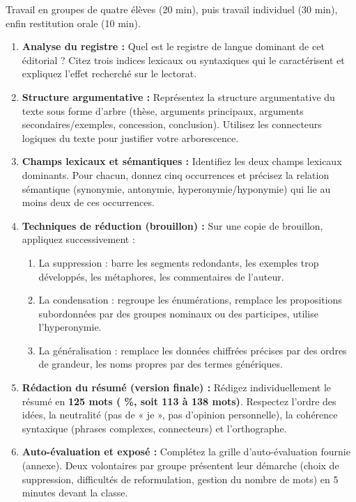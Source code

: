 \documentclass[11pt]{article}
\newcommand{\cle}[1]{{\popxbold\color{popdark}#1}}
\newcounter{popsec}
\newcounter{popsub}
\newcommand{\courssub}[1]{%
  \stepcounter{popsub}%
  \par\vspace{9pt}\noindent{\popxbold\fontsize{11.5}{13}\selectfont\color{popink}{\color{poporange}\thepopsec.\thepopsub}\hspace{6pt}#1}\par\nopagebreak\vspace{4pt}
}
\begin{document}
\courssub{Consignes}
\noindent Travail en groupes de quatre élèves (20 min), puis travail individuel (30 min), enfin restitution orale (10 min).
\begin{enumerate}
    \item \textbf{Analyse du registre :} Quel est le registre de langue dominant de cet éditorial ? Citez trois indices lexicaux ou syntaxiques qui le caractérisent et expliquez l'effet recherché sur le lectorat.
    \item \textbf{Structure argumentative :} Représentez la structure argumentative du texte sous forme d'arbre (thèse, arguments principaux, arguments secondaires/exemples, concession, conclusion). Utilisez les connecteurs logiques du texte pour justifier votre arborescence.
    \item \textbf{Champs lexicaux et sémantiques :} Identifiez les deux champs lexicaux dominants. Pour chacun, donnez cinq occurrences et précisez la relation sémantique (synonymie, antonymie, hyperonymie/hyponymie) qui lie au moins deux de ces occurrences.
    \item \textbf{Techniques de réduction (brouillon) :} Sur une copie de brouillon, appliquez successivement :
    \begin{enumerate}
        \item La \cle{suppression} : barre les segments redondants, les exemples trop développés, les métaphores, les commentaires de l'auteur.
        \item La \cle{condensation} : regroupe les énumérations, remplace les propositions subordonnées par des groupes nominaux ou des participes, utilise l'hyperonymie.
        \item La \cle{généralisation} : remplace les données chiffrées précises par des ordres de grandeur, les noms propres par des termes génériques.
    \end{enumerate}
    \item \textbf{Rédaction du résumé (version finale) :} Rédigez individuellement le résumé en \textbf{125 mots ( \%, soit 113 à 138 mots)}. Respectez l'ordre des idées, la neutralité (pas de « je », pas d'opinion personnelle), la cohérence syntaxique (phrases complexes, connecteurs) et l'orthographe.
    \item \textbf{Auto-évaluation et exposé :} Complétez la grille d'auto-évaluation fournie (annexe). Deux volontaires par groupe présentent leur démarche (choix de suppression, difficultés de reformulation, gestion du nombre de mots) en 5 minutes devant la classe.
\end{enumerate}
\end{document}
